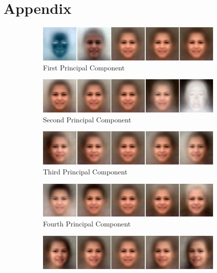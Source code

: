 \newpage
\appendix
\section{Appendix}

\begin{figure}
    \centering
    \begin{subfigure}[b]{\textwidth}
        \includegraphics[width=\textwidth]{fig/PCA/pca0}
        \caption{First Principal Component}
    \end{subfigure}
    \begin{subfigure}[b]{\textwidth}
        \includegraphics[width=\textwidth]{fig/PCA/pca1}
        \caption{Second Principal Component}
    \end{subfigure}
    \begin{subfigure}[b]{\textwidth}
        \includegraphics[width=\textwidth]{fig/PCA/pca2}
        \caption{Third Principal Component}
    \end{subfigure}
    \begin{subfigure}[b]{\textwidth}
        \includegraphics[width=\textwidth]{fig/PCA/pca3}
        \caption{Fourth Principal Component}
    \end{subfigure}
    \begin{subfigure}[b]{\textwidth}
        \includegraphics[width=\textwidth]{fig/PCA/pca4}

\end{subfigure}
\end{figure}
